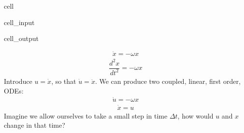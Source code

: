 \documentclass[letterpaper,10pt,english]{jupyterBook}
\begin{document}
\begin{sphinxuseclass}{cell}\begin{sphinxVerbatimInput}

\begin{sphinxuseclass}{cell_input}
\begin{sphinxVerbatim}[commandchars=\\\{\}]
  
     
\end{sphinxVerbatim}

\end{sphinxuseclass}\end{sphinxVerbatimInput}
\begin{sphinxVerbatimOutput}

\begin{sphinxuseclass}{cell_output}
\noindent{}

\end{sphinxuseclass}\end{sphinxVerbatimOutput}

\end{sphinxuseclass}\begin{equation*}
\begin{split}\ddot{x} = -\omega x\end{split}
\end{equation*}\begin{equation*}
\begin{split}\dfrac{d^2x}{dt^2} = -\omega x\end{split}
\end{equation*}
\sphinxAtStartPar
Introduce \(u=\dot{x}\), so that \(\dot{u}=\ddot{x}\). We can produce two coupled, linear, first order, ODEs:
\begin{equation*}
\begin{split}\dot{u} = -\omega x\end{split}
\end{equation*}\begin{equation*}
\begin{split}\dot{x} = u\end{split}
\end{equation*}
\sphinxAtStartPar
Imagine we allow ourselves to take a small step in time \(\Delta t\), how would \(u\) and \(x\) change in that time?
\end{document}
